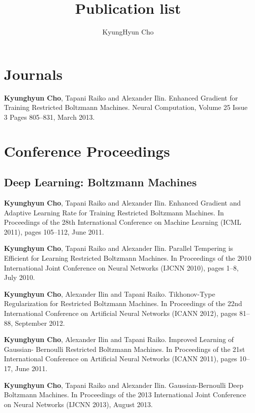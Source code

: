 \documentclass[11pt, oneside]{essay}
\title{Publication list}
\author{KyungHyun Cho}
\begin{document}
\maketitle

\vspace{5mm}

\section{Journals}

\textbf{Kyunghyun Cho}, Tapani Raiko and Alexander Ilin. Enhanced
Gradient for Training Restricted Boltzmann Machines. Neural
Computation, Volume 25 Issue 3 Pages 805--831, March 2013.

\section{Conference Proceedings}

\subsection{Deep Learning: Boltzmann Machines}

\textbf{Kyunghyun Cho}, Tapani Raiko and Alexander Ilin. Enhanced
Gradient and Adaptive Learning Rate for Training
Restricted Boltzmann Machines. In Proceedings of the 28th
International Conference on Machine Learning (ICML 2011),
pages 105--112, June 2011.

\textbf{Kyunghyun Cho}, Tapani Raiko and Alexander Ilin. Parallel
Tempering is Efficient for Learning Restricted Boltzmann
Machines. In Proceedings of the 2010 International Joint
Conference on Neural Networks (IJCNN 2010), pages 1--8, July
2010.

\textbf{Kyunghyun Cho}, Alexander Ilin and Tapani Raiko.
Tikhonov-Type Regularization for Restricted Boltzmann
Machines. In Proceedings of the 22nd International
Conference on Artificial Neural Networks (ICANN 2012), pages
81--88, September 2012.

\textbf{Kyunghyun Cho}, Alexander Ilin and Tapani Raiko. Improved
Learning of Gaussian- Bernoulli Restricted Boltzmann
Machines. In Proceedings of the 21st International
Conference on Artificial Neural Networks (ICANN 2011), pages
10--17, June 2011.

\textbf{Kyunghyun Cho}, Tapani Raiko and Alexander Ilin.
Gaussian-Bernoulli Deep Boltzmann Machines. In Proceedings
of the 2013 International Joint Conference on Neural
Networks (IJCNN 2013), August 2013.
\end{document}
